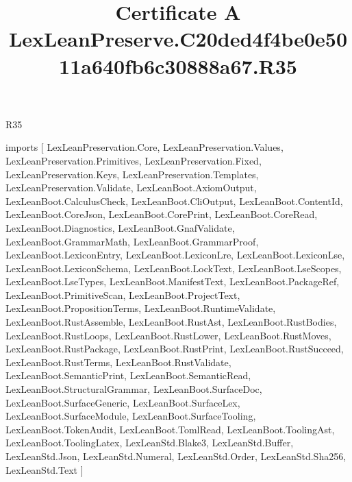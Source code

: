 \begin{lexlean}{R35}
\title{Certificate A LexLeanPreserve.C20ded4f4be0e5011a640fb6c30888a67.R35}
\begin{coremodule}
imports [
  LexLeanPreservation.Core,
  LexLeanPreservation.Values,
  LexLeanPreservation.Primitives,
  LexLeanPreservation.Fixed,
  LexLeanPreservation.Keys,
  LexLeanPreservation.Templates,
  LexLeanPreservation.Validate,
  LexLeanBoot.AxiomOutput,
  LexLeanBoot.CalculusCheck,
  LexLeanBoot.CliOutput,
  LexLeanBoot.ContentId,
  LexLeanBoot.CoreJson,
  LexLeanBoot.CorePrint,
  LexLeanBoot.CoreRead,
  LexLeanBoot.Diagnostics,
  LexLeanBoot.GnafValidate,
  LexLeanBoot.GrammarMath,
  LexLeanBoot.GrammarProof,
  LexLeanBoot.LexiconEntry,
  LexLeanBoot.LexiconLre,
  LexLeanBoot.LexiconLse,
  LexLeanBoot.LexiconSchema,
  LexLeanBoot.LockText,
  LexLeanBoot.LseScopes,
  LexLeanBoot.LseTypes,
  LexLeanBoot.ManifestText,
  LexLeanBoot.PackageRef,
  LexLeanBoot.PrimitiveScan,
  LexLeanBoot.ProjectText,
  LexLeanBoot.PropositionTerms,
  LexLeanBoot.RuntimeValidate,
  LexLeanBoot.RustAssemble,
  LexLeanBoot.RustAst,
  LexLeanBoot.RustBodies,
  LexLeanBoot.RustLoops,
  LexLeanBoot.RustLower,
  LexLeanBoot.RustMoves,
  LexLeanBoot.RustPackage,
  LexLeanBoot.RustPrint,
  LexLeanBoot.RustSucceed,
  LexLeanBoot.RustTerms,
  LexLeanBoot.RustValidate,
  LexLeanBoot.SemanticPrint,
  LexLeanBoot.SemanticRead,
  LexLeanBoot.StructuralGrammar,
  LexLeanBoot.SurfaceDoc,
  LexLeanBoot.SurfaceGeneric,
  LexLeanBoot.SurfaceLex,
  LexLeanBoot.SurfaceModule,
  LexLeanBoot.SurfaceTooling,
  LexLeanBoot.TokenAudit,
  LexLeanBoot.TomlRead,
  LexLeanBoot.ToolingAst,
  LexLeanBoot.ToolingLatex,
  LexLeanStd.Blake3,
  LexLeanStd.Buffer,
  LexLeanStd.Json,
  LexLeanStd.Numeral,
  LexLeanStd.Order,
  LexLeanStd.Sha256,
  LexLeanStd.Text
]


\end{coremodule}
\end{lexlean}
